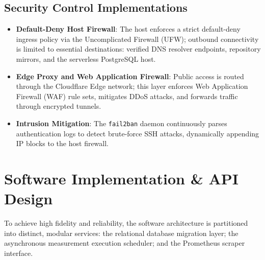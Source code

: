 \documentclass[10pt,journal,compsoc]{IEEEtran}
\begin{document}
\subsection{Security Control Implementations}
\begin{itemize}
    \item \textbf{Default-Deny Host Firewall}: The host enforces a strict default-deny ingress policy via the Uncomplicated Firewall (UFW); outbound connectivity is limited to essential destinations: verified DNS resolver endpoints, repository mirrors, and the serverless PostgreSQL host.
    \item \textbf{Edge Proxy and Web Application Firewall}: Public access is routed through the Cloudflare Edge network; this layer enforces Web Application Firewall (WAF) rule sets, mitigates DDoS attacks, and forwards traffic through encrypted tunnels.
    \item \textbf{Intrusion Mitigation}: The \texttt{fail2ban} daemon continuously parses authentication logs to detect brute-force SSH attacks, dynamically appending IP blocks to the host firewall.
\end{itemize}

\section{Software Implementation \& API Design}
To achieve high fidelity and reliability, the software architecture is partitioned into distinct, modular services: the relational database migration layer; the asynchronous measurement execution scheduler; and the Prometheus scraper interface.
\end{document}
